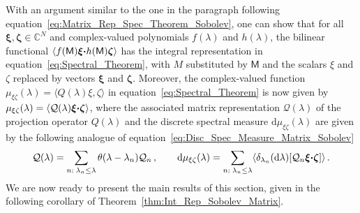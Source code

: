 \documentclass[english,12pt,jmp,graphicx]{revtex4-1}
\newcommand{\vecw}{\boldsymbol{w}}
\newcommand{\vecxi}{\boldsymbol{\xi}}
\newcommand{\veczeta}{\boldsymbol{\zeta}}
\newcommand{\thmref}[1]{Theorem~\ref{#1}}
\newcommand{\bcdot}{\mbox{\boldmath${\cdot}$}}
\renewcommand{\d}{\mathrm{d}}
\newcommand{\Mm}{\mathsf{M}}
\newcommand{\Qc}{\mathcal{Q}}
\begin{document}
With an argument similar to the one in the paragraph following
equation~\eqref{eq:Matrix_Rep_Spec_Theorem_Sobolev}, one can show that
for 
all $\vecxi,\veczeta\in\mathbb{C}^N$ and complex-valued polynomials
$f(\lambda)$ and $h(\lambda)$, the bilinear functional
$\langle f(\Mm)\vecxi\bcdot h(\Mm)\veczeta\rangle$
has the integral representation   
 in equation~\eqref{eq:Spectral_Theorem}, with
$M$ substituted by $\Mm$ and the scalars $\xi$ and $\zeta$ replaced by
vectors $\vecxi$ and $\veczeta$. Moreover,
the complex-valued function 
$\mu_{\xi\zeta}(\lambda)=\langle Q(\lambda)\xi,\zeta\rangle$ in equation~\eqref{eq:Spectral_Theorem} is
now given by $\mu_{\xi\zeta}(\lambda)=\langle\Qc(\lambda)\vecxi\bcdot\veczeta\rangle$, where the
associated matrix representation $\Qc(\lambda)$ of the projection operator
$Q(\lambda)$ and the discrete spectral measure
$\d\mu_{\xi\zeta}(\lambda)$ are given by the following analogue of
equation~\eqref{eq:Disc_Spec_Measure_Matrix_Sobolev}  
% 
\begin{align}\label{eq:Disc_Spec_Measure_Matrix}
  \Qc(\lambda)=\sum_{n:\;\lambda_n\leq\lambda}\theta(\lambda-\lambda_n)\Qc_n\,,
  \qquad
  \d\mu_{\xi\zeta}(\lambda)=\sum_{n:\;\lambda_n\leq\lambda}\langle\delta_{\lambda_n}(\d\lambda)[\Qc_n\vecxi\bcdot\veczeta]\rangle\,.
\end{align}
%
We are now ready to present the main results of this section, given in
the following corollary of \thmref{thm:Int_Rep_Sobolev_Matrix}. 
\end{document}
